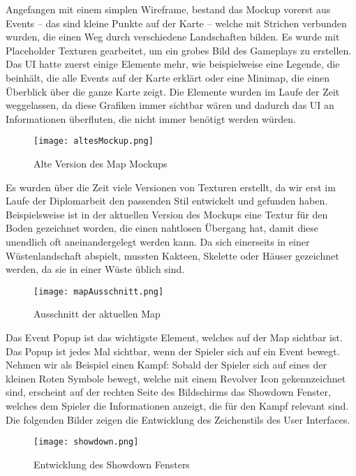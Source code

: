 Angefangen mit einem simplen Wireframe, bestand das Mockup vorerst aus Events – das sind kleine Punkte auf der Karte – welche mit Strichen verbunden wurden, die einen Weg durch verschiedene Landschaften bilden. Es wurde mit Placeholder Texturen gearbeitet, um ein grobes Bild des Gameplays zu erstellen. Das UI hatte zuerst einige Elemente mehr, wie beispielweise eine Legende, die beinhält, die alle Events auf der Karte erklärt oder eine Minimap, die einen Überblick über die ganze Karte zeigt. Die Elemente wurden im Laufe der Zeit weggelassen, da diese Grafiken immer sichtbar wären und dadurch das UI an Informationen überfluten, die nicht immer benötigt werden würden.

\begin{figure}[H]
    \centering
    \texttt{[image: altesMockup.png]}
    \caption{Alte Version des Map Mockups}
\end{figure}

Es wurden über die Zeit viele Versionen von Texturen erstellt, da wir erst im Laufe der Diplomarbeit den passenden Stil entwickelt und gefunden haben. Beispielsweise ist in der aktuellen Version des \FF Mockups eine Textur für den Boden gezeichnet worden, die einen nahtlosen Übergang hat, damit diese unendlich oft aneinandergelegt werden kann. Da sich \FF einerseits in einer Wüstenlandschaft abspielt, mussten Kakteen, Skelette oder Häuser gezeichnet werden, da sie in einer Wüste üblich sind.

\begin{figure}[H]
    \centering
    \texttt{[image: mapAusschnitt.png]}
    \caption{Ausschnitt der aktuellen Map}
\end{figure}

Das Event Popup ist das wichtigste Element, welches auf der Map sichtbar ist. Das Popup ist jedes Mal sichtbar, wenn der Spieler sich auf ein Event bewegt. Nehmen wir als Beispiel einen Kampf: Sobald der Spieler sich auf eines der kleinen Roten Symbole bewegt, welche mit einem Revolver Icon gekennzeichnet sind, erscheint auf der rechten Seite des Bildschirms das Showdown Fenster, welches dem Spieler die Informationen anzeigt, die für den Kampf relevant sind. Die folgenden Bilder zeigen die Entwicklung des Zeichenstils des User Interfaces.

\begin{figure}[H]
    \centering
    \texttt{[image: showdown.png]}
    \caption{Entwicklung des Showdown Fensters}
\end{figure}

